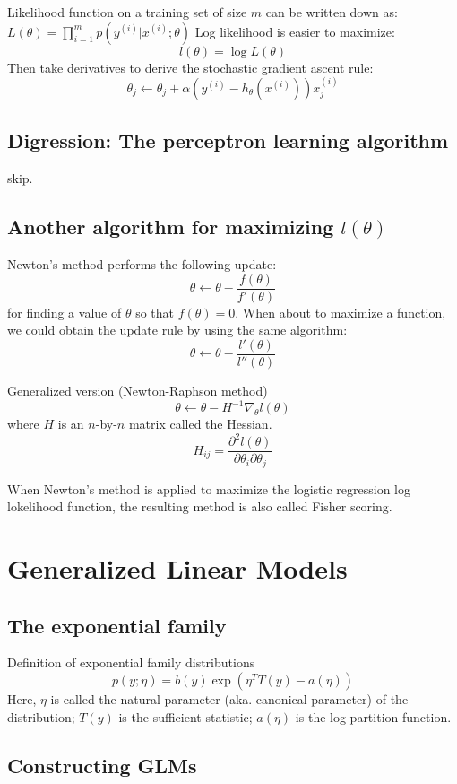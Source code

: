 Likelihood function on a training set of size $m$ can be written down as:
$L(\theta) = \prod_{i=1}^m p(y^{(i)}|x^{(i)};\theta)$
Log likelihood is easier to maximize:
$$l(\theta) = \log L(\theta)$$
Then take derivatives to derive the stochastic gradient ascent rule:
$$\theta_j \leftarrow \theta_j + \alpha (y^{(i)} - h_\theta(x^{(i)}))x^{(i)}_j$$

\subsection{Digression: The perceptron learning algorithm}

skip.

\subsection{Another algorithm for maximizing $l(\theta)$}

Newton's method performs the following update:
$$\theta \leftarrow \theta - \frac{f(\theta)}{f'(\theta)}$$
for finding a value of $\theta$ so that $f(\theta)=0$.
When about to maximize a function, we could obtain the update rule
by using the same algorithm:
$$\theta \leftarrow \theta - \frac{l'(\theta)}{l''(\theta)}$$

Generalized version (Newton-Raphson method)
$$\theta \leftarrow \theta - H^{-1} \nabla_\theta l(\theta)$$
where $H$ is an $n$-by-$n$ matrix called the Hessian.
$$H_{ij} = \frac{\partial^2 l(\theta)}{\partial\theta_i\partial\theta_j}$$

When Newton's method is applied to maximize the logistic regression log
lokelihood function, the resulting method is also called Fisher scoring.

\section{Generalized Linear Models}

\subsection{The exponential family}

Definition of exponential family distributions
$$p(y;\eta) = b(y)\exp(\eta^TT(y)-a(\eta))$$
Here, $\eta$ is called the natural parameter (aka. canonical parameter) of
the distribution; $T(y)$ is the sufficient statistic; $a(\eta)$ is the log
partition function.

\subsection{Constructing GLMs}

